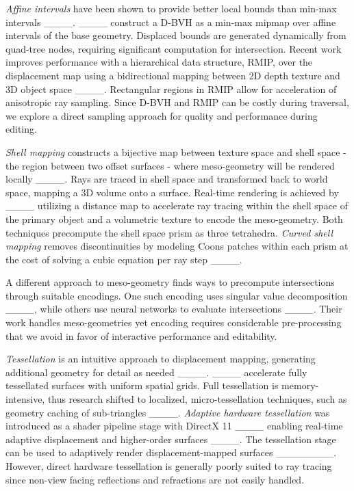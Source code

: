 \textit{Affine intervals} have been shown to provide better local bounds than min-max intervals ____. ____ construct a D-BVH as a min-max mipmap over affine intervals of the base geometry. Displaced bounds are generated dynamically from quad-tree nodes, requiring significant computation for intersection. Recent work improves performance with a hierarchical data structure, RMIP, over the displacement map using a bidirectional mapping between 2D depth texture and 3D object space  ____. Rectangular regions in RMIP allow for acceleration of anisotropic ray sampling. Since D-BVH and RMIP can be costly during traversal, we explore a direct sampling approach for quality and performance during editing. 
 
\textit{Shell mapping} constructs a bijective map between texture space and shell space - the region between two offset surfaces - where meso-geometry will be rendered locally ____. Rays are traced in shell space and transformed back to world space, mapping a 3D volume onto a surface. Real-time rendering is achieved by ____ utilizing a distance map to accelerate ray tracing within the shell space of the primary object and a volumetric texture to encode the meso-geometry. Both techniques precompute the shell space prism as three tetrahedra.  \textit{Curved shell mapping} removes discontinuities by modeling Coons patches within each prism at the cost of solving a cubic equation per ray step ____.

A different approach to meso-geometry finds ways to precompute intersections through suitable encodings. One such encoding uses singular value decomposition ____, while others use neural networks to evaluate intersections ____. Their work handles meso-geometries yet encoding requires considerable pre-processing that we avoid in favor of interactive performance and editability.

\textit{Tessellation} is an intuitive approach to displacement mapping, generating additional geometry for detail as needed  ____. ____ accelerate fully tessellated surfaces with uniform spatial grids. Full tessellation is memory-intensive, thus research shifted to localized, micro-tessellation techniques, such as geometry caching of sub-triangles ____. \textit{Adaptive hardware tessellation} was introduced as a shader pipeline stage with DirectX 11 ____  enabling real-time adaptive displacement and higher-order surfaces ____.  The tessellation stage can be used to adaptively render displacement-mapped surfaces ________. However, direct hardware tessellation is generally poorly suited to ray tracing since non-view facing reflections and refractions are not easily handled.

